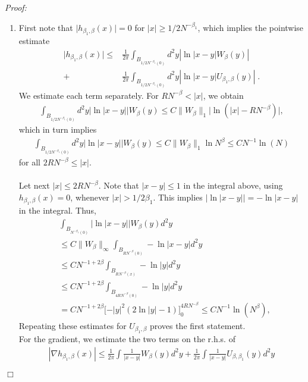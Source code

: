 \documentclass[11pt, english, american]{article}
\newenvironment{proof}{\emph{Proof:}}{\begin{flushright} $ \Box $ \end{flushright}}
\begin{document}
\begin{proof}
\begin{enumerate}
\item  
First note that $\vert h_{\beta_1,\beta}(x) \vert=0$ for $\vert x \vert \ge 1/2 N^{-\beta_1}$, which implies the pointwise estimate
\begin{align*}
\vert h_{\beta_1,\beta}(x)|  \leq &
\frac{1}{2 \pi} \int_{B_{1/2 N^{-\beta_1}(0)}} d^2y
\left|
\ln |x-y| W_\beta (y)
\right|
\\
+&
\frac{1}{2 \pi} 
\int_{B_{1/2 N^{-\beta_1}(0)}} d^2y
\left|
\ln |x-y| U_{\beta_1, \beta} (y)
\right| \;.
\end{align*}
We estimate each term separately.
For $ R N^{-\beta} < \vert x \vert$, we obtain
\begin{align*}
\int_{B_{1/2 N^{-\beta_1}(0)}} d^2y |\ln |x-y| |
W_{\beta}(y) \le C \|W_\beta \|_1   \vert \ln (\vert x \vert - RN^{-\beta} )\vert,
\end{align*}
which in turn implies
\begin{align*}
\int_{B_{1/2 N^{-\beta_1}(0)}} d^2y |\ln |x-y| |
W_{\beta}(y)
 \le C \|W_\beta \|_1 \ln N^{\beta}\le C N^{-1} \ln \left( N \right)
\end{align*}
for all $2R N^{-\beta} \le \vert x \vert$.\\
\\
Let next $|x|\leq 2RN^{-\beta}$.
Note that $|x-y| \leq 1$ in the integral above, using $h_{\beta_1, \beta}(x)=0$, whenever
$|x| > 1/2 \beta_1$. This implies
$|\ln|x-y||= - \ln|x-y|$ in the integral.
Thus,
\begin{align*}
&\int_{B_{N^{-\beta_1}(0)}}
  |\ln |x-y| |
W_{\beta}(y)d^2y \nonumber\\
& \le C \| W_{\beta} \|_{\infty} \int_{ B_{RN^{-\beta}(0)}} - \ln  \vert x-y \vert  d^2y \nonumber\\
& \le C N^{-1 + 2 \beta} \int_{ B_{RN^{-\beta}(x)}} - \ln \vert y\vert  d^2y \nonumber\\
& \le C N^{-1 + 2 \beta} \int_{B_{4RN^{-\beta}(0)}} - \ln  \vert y\vert    d^2y \nonumber\\
& = C N^{-1 + 2 \beta}\Big[- \vert y\vert^2 (2\ln \vert y \vert -1) \Big]_0^{4RN^{-\beta}}  \le C N^{-1} \ln  \left( N^{\beta} \right),\nonumber
\end{align*}
Repeating these estimates for $U_{\beta_1, \beta}$ proves the first statement.\\
For the gradient, we estimate the two terms on the r.h.s. of
\begin{align*}|\nabla h_{\beta_1,\beta}(x)|\leq \frac{1}{2\pi }\int \frac{1}{|x-y|} W_{\beta}(y)d^2y + \frac{1}{2\pi }\int \frac{1}{|x-y|} U_{\beta,\beta_1}(y)d^2y

\end{align*}
\end{enumerate}
\end{proof}
\end{document}
